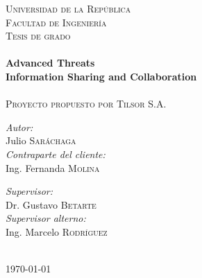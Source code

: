 \pagestyle{empty}
\sffamily

\noindent
\begin{center}
	\textsc{\huge Universidad de la República}\\[1.5cm] %

   \textsc{\LARGE Facultad de Ingeniería}\\[1.5cm] %
   \textsc{\Large Tesis de grado}\\[0.5cm] %
   
   \HRule \\[0.4cm] %
   {\huge \bfseries Advanced Threats \\ \bigskip Information Sharing and Collaboration}\\[0.4cm] %
   \HRule \\[1.5cm] %
   
   \textsc{\large Proyecto propuesto por Tilsor S.A.}\\[1.5cm] %

   \begin{minipage}{0.4\textwidth}
   	\begin{flushleft} \large
   		\emph{Autor:}\\
   		{Julio \textsc{Saráchaga}}\\
   		\bigskip
   		\emph{Contraparte del cliente:}\\
   		{Ing. Fernanda \textsc{Molina}} 
   	\end{flushleft}
   \end{minipage}
   \begin{minipage}{0.4\textwidth}
   	\begin{flushright} \large
   		\emph{Supervisor:} \\
   		{Dr. Gustavo \textsc{Betarte}}\\
   		\bigskip
   		\emph{Supervisor alterno:} \\
   		{Ing. Marcelo \textsc{Rodríguez}}
   	\end{flushright}
   \end{minipage}\\[3cm]
   
   {\large \today}\\[4cm] %
   
   \vfill
\end{center}

\cleardoublepage

\rmfamily
\normalfont

\newpage
\pagestyle{empty}
\mbox{}
